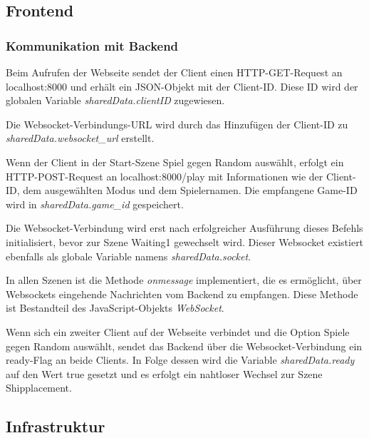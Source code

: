 \documentclass[a4paper, 10pt, conference]{IEEEtran}
\begin{document}
\subsection{Frontend}\label{subsec:frontend}

\subsubsection{Kommunikation mit Backend}\label{subsec:comwithbackend}

Beim Aufrufen der Webseite sendet der Client einen HTTP-GET-Request an \glqq localhost:8000\grqq{} und erhält ein JSON-Objekt mit der Client-ID. Diese ID wird der globalen Variable \textit{sharedData.clientID} zugewiesen.

Die Websocket-Verbindungs-URL wird durch das Hinzufügen der Client-ID zu \textit{sharedData.websocket\_url} erstellt.

Wenn der Client in der Start-Szene \glqq Spiel gegen Random\grqq{} auswählt, erfolgt ein HTTP-POST-Request an \glqq localhost:8000/play\grqq{} mit Informationen wie der Client-ID, dem ausgewählten Modus und dem Spielernamen. Die empfangene Game-ID wird in \textit{sharedData.game\_id} gespeichert.

Die Websocket-Verbindung wird erst nach erfolgreicher Ausführung dieses Befehls initialisiert, bevor zur Szene \glqq Waiting1\grqq{} gewechselt wird. Dieser Websocket existiert ebenfalls als globale Variable namens \textit{sharedData.socket}.

In allen Szenen ist die Methode \textit{onmessage} implementiert, die es ermöglicht, über Websockets eingehende Nachrichten vom Backend zu empfangen. Diese Methode ist Bestandteil des JavaScript-Objekts \textit{WebSocket}.

Wenn sich ein zweiter Client auf der Webseite verbindet und die Option \glqq Spiele gegen Random\grqq{} auswählt, sendet das Backend über die Websocket-Verbindung ein \glqq ready\grqq{}-Flag an beide Clients. In Folge dessen wird die Variable \textit{sharedData.ready} auf den Wert \glqq true\grqq{} gesetzt und es erfolgt ein nahtloser Wechsel zur Szene \glqq Shipplacement\grqq{}.





\subsection{Infrastruktur}\label{subsec:infrastruktur}
\end{document}
